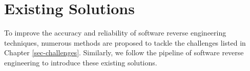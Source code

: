 \chapter{Existing Solutions}\label{sec-existing-solutions}

To improve the accuracy and reliability of software reverse engineering
techniques, numerous methods are proposed to tackle the challenges listed in
Chapter \ref{sec-challenges}.
Similarly, we follow the pipeline of software reverse engineering to introduce
these existing solutions.







\newpage
